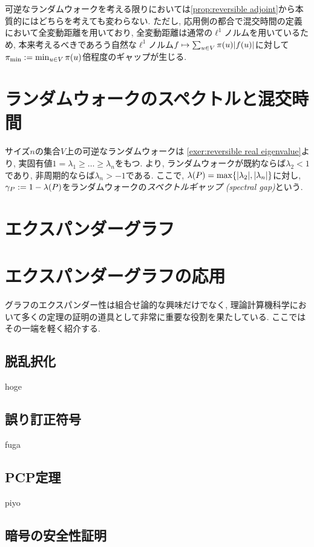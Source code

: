 可逆なランダムウォークを考える限りにおいては\cref{prop:reversible adjoint}から本質的にはどちらを考えても変わらない.
ただし, 応用側の都合で混交時間の定義において全変動距離を用いており, 全変動距離は通常の$\ell^1$ノルムを用いているため, 本来考えるべきであろう自然な$\ell^1$ノルム$f \mapsto \sum_{u \in V} \pi(u)\lvert f(u)\rvert$に対して$\pi_{\min} \mathrel{:=} \min_{u\in V}\pi(u)$倍程度のギャップが生じる.

\section{ランダムウォークのスペクトルと混交時間}
サイズ$n$の集合$V$上の可逆なランダムウォークは
\cref{exer:reversible real eigenvalue}より,
実固有値$1=\lambda_1 \ge \dots \ge \lambda_n$をもつ.
より,
ランダムウォークが既約ならば$\lambda_2<1$であり,
非周期的ならば$\lambda_n > -1$である.
ここで, $\lambda(P)=\max\{\lvert\lambda_2\rvert,\lvert\lambda_n\rvert\}$に対し,
$\gamma_P \mathrel{:=} 1 - \lambda(P)$をランダムウォークの\emph{スペクトルギャップ (spectral gap)}という.

\section{エクスパンダーグラフ}

\section{エクスパンダーグラフの応用}
グラフのエクスパンダー性は組合せ論的な興味だけでなく,
理論計算機科学において多くの定理の証明の道具として非常に重要な役割を果たしている.
ここではその一端を軽く紹介する.
\subsection{脱乱択化}
hoge
\subsection{誤り訂正符号}
fuga
\subsection{PCP定理}
piyo
\subsection{暗号の安全性証明}
